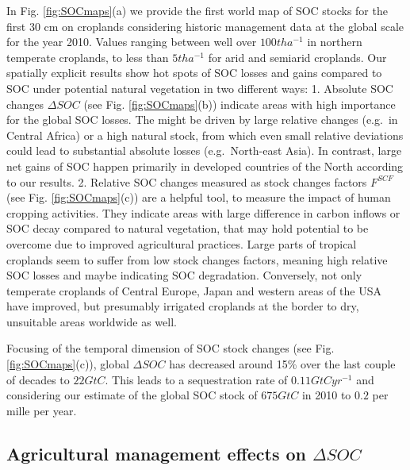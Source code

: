 \documentclass[gc, manuscript]{copernicus}
\begin{document}
In Fig. \ref{fig:SOCmaps}(a) we provide the first world map of SOC stocks for the first 30 cm on croplands considering historic management data at the global scale for the year 2010. Values ranging between well over \(100\unit{t ha^{-1}}\) in northern temperate croplands, to less than \(5\unit{t ha^{-1}}\) for arid and semiarid croplands.
Our spatially explicit results show hot spots of SOC losses and gains compared to SOC under potential natural vegetation in two different ways:
1. Absolute SOC changes \(\Delta SOC\) (see Fig. \ref{fig:SOCmaps}(b)) indicate areas with high importance for the global SOC losses. The might be driven by large relative changes (e.g.~in Central Africa) or a high natural stock, from which even small relative deviations could lead to substantial absolute losses (e.g.~North-east Asia). In contrast, large net gains of SOC happen primarily in developed countries of the North according to our results.
2. Relative SOC changes measured as stock changes factors \(F^{SCF}\) (see Fig. \ref{fig:SOCmaps}(c)) are a helpful tool, to measure the impact of human cropping activities. They indicate areas with large difference in carbon inflows or SOC decay compared to natural vegetation, that may hold potential to be overcome due to improved agricultural practices. Large parts of tropical croplands seem to suffer from low stock changes factors, meaning high relative SOC losses and maybe indicating SOC degradation. Conversely, not only temperate croplands of Central Europe, Japan and western areas of the USA have improved, but presumably irrigated croplands at the border to dry, unsuitable areas worldwide as well.

Focusing of the temporal dimension of SOC stock changes (see Fig. \ref{fig:SOCmaps}(c)), global \(\Delta SOC\) has decreased around 15\% over the last couple of decades to \(22\unit{GtC}\). This leads to a sequestration rate of \(0.11\unit{GtC yr^{-1}}\) and considering our estimate of the global SOC stock of \(675\unit{GtC}\) in 2010 to \(0.2\) per mille per year.

\hypertarget{agricultural-management-effects-on-delta-soc}{%
\subsection{\texorpdfstring{Agricultural management effects on \(\Delta SOC\)}{Agricultural management effects on \textbackslash Delta SOC}}\label{agricultural-management-effects-on-delta-soc}}
\end{document}
